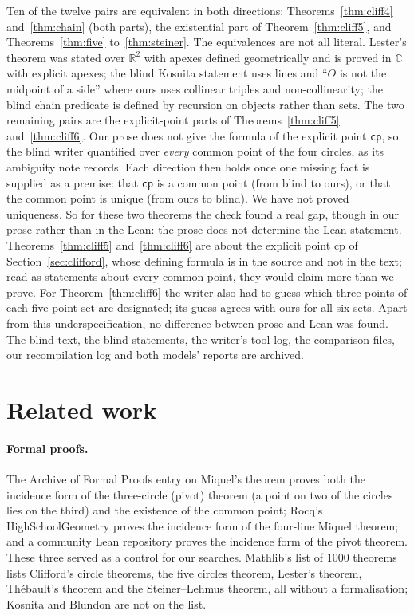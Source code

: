 \documentclass[11pt]{article}
\theoremstyle{definition}
\theoremstyle{remark}
\newcommand{\lean}[1]{\texttt{#1}}
\begin{document}
Ten of the twelve pairs are equivalent in both directions: Theorems~\ref{thm:cliff4} and~\ref{thm:chain}
(both parts), the existential part of Theorem~\ref{thm:cliff5}, and Theorems~\ref{thm:five}
to~\ref{thm:steiner}. The equivalences are not all literal. Lester's theorem was stated over
$\mathbb{R}^2$ with apexes defined geometrically and is proved in $\mathbb{C}$ with explicit apexes; the
blind Kosnita statement uses lines and ``$O$ is not the midpoint of a side'' where ours uses collinear
triples and non-collinearity; the blind chain predicate is defined by recursion on objects rather than
sets. The two remaining pairs are the explicit-point parts of Theorems~\ref{thm:cliff5}
and~\ref{thm:cliff6}. Our prose does not give the formula of the explicit point \lean{cp}, so the blind
writer quantified over \emph{every} common point of the four circles, as its ambiguity note records.
Each direction then holds once one missing fact is supplied as a premise: that \lean{cp} is a common
point (from blind to ours), or that the common point is unique (from ours to blind). We have not proved
uniqueness. So for these two theorems the check found a real gap, though in our prose rather than in
the Lean: the prose does not determine the Lean statement. Theorems~\ref{thm:cliff5} and~\ref{thm:cliff6}
are about the explicit point $\mathrm{cp}$ of Section~\ref{sec:clifford}, whose defining formula is in
the source and not in the text; read as statements about every common point, they would claim more than
we prove. For Theorem~\ref{thm:cliff6} the writer also had to guess which three points of each
five-point set are designated; its guess agrees with ours for all six sets. Apart from this
underspecification, no difference between prose and Lean was found. The blind text, the blind
statements, the writer's tool log, the comparison files, our recompilation log and both models' reports
are archived.

\section{Related work}\label{sec:related}

\paragraph{Formal proofs.} The Archive of Formal Proofs entry on Miquel's theorem \cite{afpmiquel} proves both the incidence
form of the three-circle (pivot) theorem (a point on two of the circles lies on the third) and the
existence of the common point; Rocq's HighSchoolGeometry \cite{hsgeometry} proves the incidence form of
the four-line Miquel theorem; and a community Lean repository \cite{leangenius} proves the incidence
form of the pivot theorem. These three served as a control for our searches.
Mathlib's list of 1000 theorems \cite{mathlib1000} lists Clifford's circle theorems, the five circles
theorem, Lester's theorem, Th\'ebault's theorem and the Steiner--Lehmus theorem, all without a
formalisation; Kosnita and Blundon are not on the list.
\end{document}
